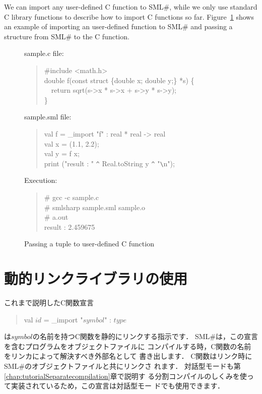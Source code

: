 \documentclass{jbook}
\newif\ifjp
\newcommand{\txt}[2]{#1}
\newcommand{\smlsharp}{SML\#}
\newcommand{\myem}{\mbox{\ \ }}
\newenvironment{program}{\begin{quote}\begin{tt}}%
                        {\end{tt}\end{quote}}
\begin{document}
	We can import any user-defined C function to \smlsharp{},
while we only use standard C library functions to describe how to
import C functions so far.
	Figure~\ref{fig:sampleStruct} shows an example of importing
an user-defined function to \smlsharp{} and passing a structure from
\smlsharp{} to the C function.

\begin{figure}
\begin{center}
\begin{minipage}{0.9\textwidth}
sample.c file:
\begin{program}
\#include <math.h>\\
double f(const struct \{double x; double y;\} *s) \{\\
\myem  return sqrt(s->x * s->x + s->y * s->y);\\
\}
\end{program}
sample.sml file:
\begin{program}
val f = \_import "f" : real * real -> real\\
val x = (1.1, 2.2);\\
val y = f x;\\
print ("result : " \verb|^| Real.toString y \verb|^| "\verb|\|n");\\
\end{program}
Execution:
\begin{program}
\# gcc -c sample.c\\
\# smlsharp sample.sml sample.o\\
\# a.out\\
result : 2.459675\\
\end{program}
\end{minipage}
\end{center}
\caption{Passing a tuple to user-defined C function}
\label{fig:sampleStruct}
\end{figure}

\fi%


\section{\txt{動的リンクライブラリの使用}{Using dynamically linked libraries}}
\label{sec:tutorialDynamiclinc}

\ifjp%
	これまで説明したC関数宣言
\begin{program}
val $\mathit{id}$ = \_import "$\mathit{symbol}$" : $\mathit{type}$
\end{program}
は$\mathit{symbol}$の名前を持つC関数を静的にリンクする指示です．
	\smlsharp{}は，この宣言を含むプログラムをオブジェクトファイルに
コンパイルする時，C関数の名前をリンカによって解決すべき外部名として
書き出します．
	C関数はリンク時に\smlsharp{}のオブジェクトファイルと共にリンクさ
れます．
	対話型モードも第\ref{chap:tutorialSeparatecompilation}章で説明す
る分割コンパイルのしくみを使って実装されているため，この宣言は対話型モー
ドでも使用できます．
\end{document}
